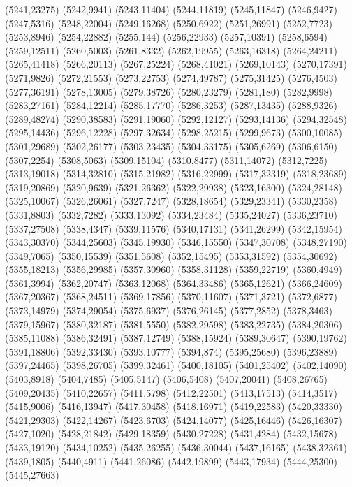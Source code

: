 (5241,23275)
(5242,9941)
(5243,11404)
(5244,11819)
(5245,11847)
(5246,9427)
(5247,5316)
(5248,22004)
(5249,16268)
(5250,6922)
(5251,26991)
(5252,7723)
(5253,8946)
(5254,22882)
(5255,144)
(5256,22933)
(5257,10391)
(5258,6594)
(5259,12511)
(5260,5003)
(5261,8332)
(5262,19955)
(5263,16318)
(5264,24211)
(5265,41418)
(5266,20113)
(5267,25224)
(5268,41021)
(5269,10143)
(5270,17391)
(5271,9826)
(5272,21553)
(5273,22753)
(5274,49787)
(5275,31425)
(5276,4503)
(5277,36191)
(5278,13005)
(5279,38726)
(5280,23279)
(5281,180)
(5282,9998)
(5283,27161)
(5284,12214)
(5285,17770)
(5286,3253)
(5287,13435)
(5288,9326)
(5289,48274)
(5290,38583)
(5291,19060)
(5292,12127)
(5293,14136)
(5294,32548)
(5295,14436)
(5296,12228)
(5297,32634)
(5298,25215)
(5299,9673)
(5300,10085)
(5301,29689)
(5302,26177)
(5303,23435)
(5304,33175)
(5305,6269)
(5306,6150)
(5307,2254)
(5308,5063)
(5309,15104)
(5310,8477)
(5311,14072)
(5312,7225)
(5313,19018)
(5314,32810)
(5315,21982)
(5316,22999)
(5317,32319)
(5318,23689)
(5319,20869)
(5320,9639)
(5321,26362)
(5322,29938)
(5323,16300)
(5324,28148)
(5325,10067)
(5326,26061)
(5327,7247)
(5328,18654)
(5329,23341)
(5330,2358)
(5331,8803)
(5332,7282)
(5333,13092)
(5334,23484)
(5335,24027)
(5336,23710)
(5337,27508)
(5338,4347)
(5339,11576)
(5340,17131)
(5341,26299)
(5342,15954)
(5343,30370)
(5344,25603)
(5345,19930)
(5346,15550)
(5347,30708)
(5348,27190)
(5349,7065)
(5350,15539)
(5351,5608)
(5352,15495)
(5353,31592)
(5354,30692)
(5355,18213)
(5356,29985)
(5357,30960)
(5358,31128)
(5359,22719)
(5360,4949)
(5361,3994)
(5362,20747)
(5363,12068)
(5364,33486)
(5365,12621)
(5366,24609)
(5367,20367)
(5368,24511)
(5369,17856)
(5370,11607)
(5371,3721)
(5372,6877)
(5373,14979)
(5374,29054)
(5375,6937)
(5376,26145)
(5377,2852)
(5378,3463)
(5379,15967)
(5380,32187)
(5381,5550)
(5382,29598)
(5383,22735)
(5384,20306)
(5385,11088)
(5386,32491)
(5387,12749)
(5388,15924)
(5389,30647)
(5390,19762)
(5391,18806)
(5392,33430)
(5393,10777)
(5394,874)
(5395,25680)
(5396,23889)
(5397,24465)
(5398,26705)
(5399,32461)
(5400,18105)
(5401,25402)
(5402,14090)
(5403,8918)
(5404,7485)
(5405,5147)
(5406,5408)
(5407,20041)
(5408,26765)
(5409,20435)
(5410,22657)
(5411,5798)
(5412,22501)
(5413,17513)
(5414,3517)
(5415,9006)
(5416,13947)
(5417,30458)
(5418,16971)
(5419,22583)
(5420,33330)
(5421,29303)
(5422,14267)
(5423,6703)
(5424,14077)
(5425,16446)
(5426,16307)
(5427,1020)
(5428,21842)
(5429,18359)
(5430,27228)
(5431,4284)
(5432,15678)
(5433,19120)
(5434,10252)
(5435,26255)
(5436,30044)
(5437,16165)
(5438,32361)
(5439,1805)
(5440,4911)
(5441,26086)
(5442,19899)
(5443,17934)
(5444,25300)
(5445,27663)
